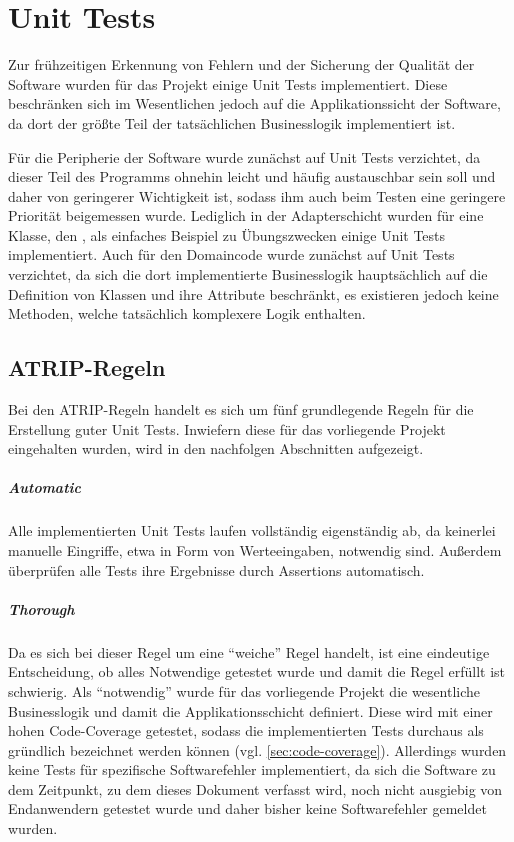 \chapter{Unit Tests}
Zur frühzeitigen Erkennung von Fehlern und der Sicherung der Qualität der Software wurden für das Projekt einige Unit Tests implementiert. Diese beschränken sich im Wesentlichen jedoch auf die Applikationssicht der Software, da dort der größte Teil der tatsächlichen Businesslogik implementiert ist. 

Für die Peripherie der Software wurde zunächst auf Unit Tests verzichtet, da dieser Teil des Programms ohnehin leicht und häufig austauschbar sein soll und daher von geringerer Wichtigkeit ist, sodass ihm auch beim Testen eine geringere Priorität beigemessen wurde. Lediglich in der Adapterschicht wurden für eine Klasse, den , als einfaches Beispiel zu Übungszwecken einige Unit Tests implementiert. Auch für den Domaincode wurde zunächst auf Unit Tests verzichtet, da sich die dort implementierte Businesslogik hauptsächlich auf die Definition von Klassen und ihre Attribute beschränkt, es existieren jedoch keine Methoden, welche tatsächlich komplexere Logik enthalten.

\section{ATRIP-Regeln}
Bei den ATRIP-Regeln handelt es sich um fünf grundlegende Regeln für die Erstellung guter Unit Tests. Inwiefern diese für das vorliegende Projekt eingehalten wurden, wird in den nachfolgen Abschnitten aufgezeigt.

\paragraph{Automatic} Alle implementierten Unit Tests laufen vollständig eigenständig ab, da keinerlei manuelle Eingriffe, etwa in Form von Werteeingaben, notwendig sind. Außerdem überprüfen alle Tests ihre Ergebnisse durch Assertions automatisch.

\paragraph{Thorough} Da es sich bei dieser Regel um eine \enquote{weiche} Regel handelt, ist eine eindeutige Entscheidung, ob alles Notwendige getestet wurde und damit die Regel erfüllt ist schwierig. Als \enquote{notwendig} wurde für das vorliegende Projekt die wesentliche Businesslogik und damit die Applikationsschicht definiert. Diese wird mit einer hohen Code-Coverage getestet, sodass die implementierten Tests durchaus als gründlich bezeichnet werden können (vgl. \autoref{sec:code-coverage}). Allerdings wurden keine Tests für spezifische Softwarefehler implementiert, da sich die Software zu dem Zeitpunkt, zu dem dieses Dokument verfasst wird, noch nicht ausgiebig von Endanwendern getestet wurde und daher bisher keine Softwarefehler gemeldet wurden.

